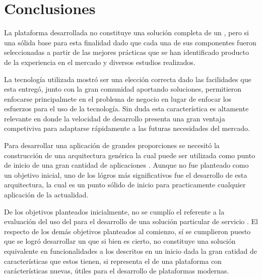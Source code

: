 

\chapter{Conclusiones} \label{cap:conclusiones}
	
	La plataforma desarrollada no constituye una solución completa de un \frameworkPC \ecommerceCOM, pero si una sólida base para esta finalidad dado que cada una de sus componentes fueron seleccionadas a partir de las mejores prácticas que se han identificado producto de la experiencia en el mercado y diversos estudios realizados.

	La tecnología utilizada mostró ser una elección correcta dado las facilidades que esta entregó, junto con la gran comunidad aportando soluciones, permitieron enfocarse principalmete en el problema de negocio en lugar de enfocar los esfuerzos para el uso de la tecnología. Sin duda esta característica es altamente relevante en donde la velocidad de desarrollo presenta una gran ventaja competiviva para adaptarse rápidamente a las futuras necesidades del mercado.

	Para desarrollar una aplicación de grandes proporciones se necesitó la construcción de una arquitectura genérica la cual puede ser utilizada como punto de inicio de una gran cantidad de aplicaciones \webINT.  
	Aunque no fue planteado como un objetivo inicial, uno de los lógros más significativos fue el desarrollo de esta arquitectura, la cual es un punto sólido de inicio para practicamente cualquier aplicación \webINT de la actualidad.

	De los objetivos planteados inicialmente, no se cumplío el referente a la evaluación del uso del \frameworkPC para el desarrollo de una solución particular de servicio \ecommerceCOM.
	El respecto de los demás objetivos planteados al comienzo, sí se cumplieron puesto que se logró desarrollar un \frameworkPC que si bien es cierto, no constituye una solución equivalente en funcionalidades a los \frameworkPC descritos en un inicio dada la gran catidad de características que estos tienen, si representa el \coreAS de una plataforma con carácterísticas nuevas, útiles para el desarrollo de plataformas modernas.

